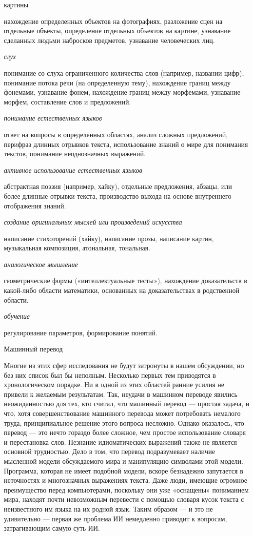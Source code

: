 картины

нахождение определенных объектов на фотографиях, разложение сцен на отдельные объекты, определение отдельных объектов на картине, узнавание сделанных людьми набросков предметов, узнавание человеческих лиц.

\emph{слух}

понимание со слуха ограниченного количества слов (например, названии цифр), понимание потока речи (на определенную тему), нахождение границ между фонемами, узнавание фонем, нахождение границ между морфемами, узнавание морфем, составление слов и предложений.

\emph{понимание естественных языков}

ответ на вопросы в определенных областях, анализ сложных предложений, перифраз длинных отрывков текста, использование знаний о мире для понимания текстов, понимание неоднозначных выражений.

\emph{активное использование естественных языков}

абстрактная поэзия (например, хайку), отдельные предложения, абзацы, или более длинные отрывки текста, производство выхода на основе внутреннего отображения знаний.

\emph{создание оригинальных мыслей или произведений искусства}

написание стихоторений (хайку), написание прозы, написание картин, музыкальная композиция, атональная, тональная.

\emph{аналогическое мышление}

геометрические формы («интеллектуальные тесты»), нахождение доказательств в какой-либо области математики, основанных на доказательствах в родственной области.

\emph{обучение}

регулирование параметров, формирование понятий.

Машинный перевод

Многие из этих сфер исследования не будут затронуты в нашем обсуждении, но без них список был бы неполным. Несколько первых тем приводятся в хронологическом порядке. Ни в одной из этих областей ранние усилия не привели к желаемым результатам. Так, неудачи в машинном переводе явились неожиданностью для тех, кто считал, что машинный перевод --- простая задача, и что, хотя совершенствование машинного перевода может потребовать немалого труда, принципиальное решение этого вопроса несложно. Однако оказалось, что перевод --- это нечто гораздо более сложное, чем простое использование словаря и перестановка слов. Незнание идиоматических выражений также не является основной трудностью. Дело в том, что перевод подразумевает наличие мысленной модели обсуждаемого мира и манипуляцию символами этой модели. Программа, которая не имеет подобной модели, вскоре безнадежно запутается в неточностях и многозначных выражениях текста. Даже люди, имеющие огромное преимущество перед компьютерами, поскольку они уже «оснащены» пониманием мира, находят почти невозможным перевести с помощью словаря кусок текста с неизвестного им языка на их родной язык. Таким образом --- и это не удивительно --- первая же проблема ИИ немедленно приводит к вопросам, затрагивающим самую суть ИИ.

